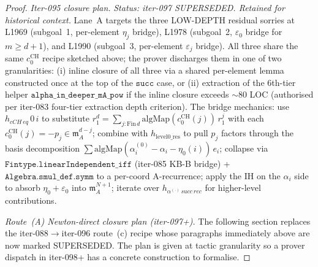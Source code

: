 \begin{proof}
\textit{Iter-095 closure plan.} \textit{Status: iter-097
SUPERSEDED. Retained for historical context.}
Lane~A targets the three LOW-DEPTH
residual sorries at L1969 (subgoal~1, per-element $\eta_j$ bridge),
L1978 (subgoal~2, $\varepsilon_0$ bridge for $m \ge d + 1$), and
L1990 (subgoal~3, per-element $\varepsilon_j$ bridge). All three
share the same $c^{\mathrm{CH}}_0$ recipe sketched above; the
prover discharges them in one of two granularities:
(i) inline closure of all three via a shared per-element lemma
constructed once at the top of the $\texttt{succ}$ case, or
(ii) extraction of the 6th-tier helper
$\texttt{alpha\_in\_deeper\_mA\_pow}$ if the inline closure exceeds
$\sim 80$ LOC (authorised per iter-083 four-tier extraction depth
criterion). The bridge mechanics: use $h_{cCH\,eq}\,0\,i$ to
substitute $r_1^d = \sum_{j : \mathrm{Fin}\,d}
\mathrm{algMap}(c^{\mathrm{CH}}_0(j))\,r_1^j$ with each
$c^{\mathrm{CH}}_0(j) = -p_j \in \mathfrak m_A^{d - j}$; combine
with $h_{\mathrm{level0\_res}}$ to pull $p_j$ factors through the
basis decomposition $\sum \mathrm{algMap}(\alpha^{(0)}_i - \alpha_i
- \eta_0(i))\,e_i$; collapse via
$\texttt{Fintype.linearIndependent\_iff}$ (iter-085 KB-B bridge) +
$\texttt{Algebra.smul\_def.symm}$ to a per-coord A-recurrence;
apply the IH on the $\alpha_i$ side to absorb $\eta_0 + \varepsilon_0$
into $\mathfrak m_A^{N+1}$; iterate over $h_{\alpha^{(\cdot)}\,succ\,
rec}$ for higher-level contributions.

\bigskip

\textit{Route~(A) Newton-direct closure plan (iter-097+).} The
following section replaces the iter-088$\to$iter-096 route~(c)
recipe whose paragraphs immediately above are now marked
SUPERSEDED. The plan is given at tactic granularity so a
prover dispatch in iter-098+ has a concrete construction to
formalise.


\end{proof}
